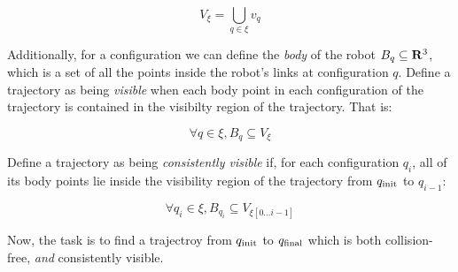 \documentclass[conference]{IEEEtran}
\begin{document}
$$ V_\xi= \bigcup_{q \in \xi} v_q $$

Additionally, for a configuration we can define the \textit{body} of the robot
$B_q \subseteq \mathbf{R}^3$, which is a set of all the points inside the robot's
links at configuration $q$. Define a trajectory as being \textit{visible} when
each body point in each configuration of the trajectory is contained in the
visibilty region of the trajectory. That is:

$$ \forall q \in \xi, B_q \subseteq V_\xi$$

\noindent Define a trajectory as being \textit{consistently visible} if, for
each configuration $q_i$, all of its body points lie inside the visibility region of
the trajectory from $q_{\text{init}}$ to $q_{i - 1}$:

$$ \forall q_i \in \xi, B_{q_i} \subseteq V_{\xi[0\ldots i - 1]}$$

Now, the task is to find a trajectroy from $q_{\text{init}}$ to $q_{\text{final}}$ which is both
collision-free, \emph{and} consistently visible.



%
%
%

\end{document}
